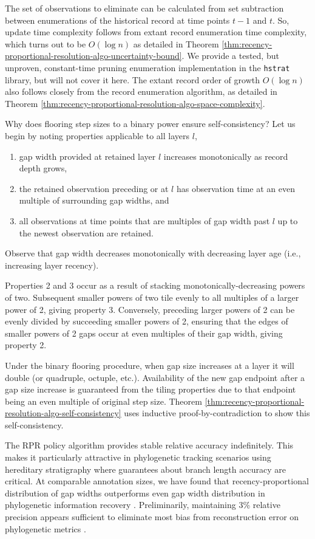 The set of observations to eliminate can be calculated from set subtraction between enumerations of the historical record at time points $t-1$ and $t$.
So, update time complexity follows from extant record enumeration time complexity, which turns out to be $O(\log n)$ as detailed in Theorem \ref{thm:recency-proportional-resolution-algo-uncertainty-bound}.
We provide a tested, but unproven, constant-time pruning enumeration implementation in the \texttt{hstrat} library, but will not cover it here. %
The extant record order of growth $O(\log n)$ also follows closely from the record enumeration algorithm, as detailed in Theorem \ref{thm:recency-proportional-resolution-algo-space-complexity}.


Why does flooring step sizes to a binary power ensure self-consistency?
Let us begin by noting properties applicable to all layers $l$,
\begin{enumerate}
\item gap width provided at retained layer $l$ increases monotonically as record depth grows,
\item the retained observation preceding or at $l$ has observation time at an even multiple of surrounding gap widths, and
\item all observations at time points that are multiples of gap width past $l$ up to the newest observation are retained.
\end{enumerate}
Observe that gap width decreases monotonically with decreasing layer age (i.e., increasing layer recency).

Properties 2 and 3 occur as a result of stacking monotonically-decreasing powers of two.
Subsequent smaller powers of two tile evenly to all multiples of a larger power of 2, giving property 3.
Conversely, preceding larger powers of 2 can be evenly divided by succeeding smaller powers of 2, ensuring that the edges of smaller powers of 2 gaps occur at even multiples of their gap width, giving property 2.

Under the binary flooring procedure, when gap size increases at a layer it will double (or quadruple, octuple, etc.).
Availability of the new gap endpoint after a gap size increase is guaranteed from the tiling properties due to that endpoint being an even multiple of original step size.
Theorem \ref{thm:recency-proportional-resolution-algo-self-consistency} uses inductive proof-by-contradiction to show this self-consistency.

The RPR policy algorithm provides stable relative accuracy indefinitely.
This makes it particularly attractive in phylogenetic tracking scenarios using hereditary stratigraphy where guarantees about branch length accuracy are critical.
At comparable annotation sizes, we have found that recency-proportional distribution of gap widths outperforms even gap width distribution in phylogenetic information recovery \citep{moreno2022hereditary}.
Preliminarily, maintaining 3\% relative precision appears sufficient to eliminate most bias from reconstruction error on phylogenetic metrics \citep{moreno2023toward}.

